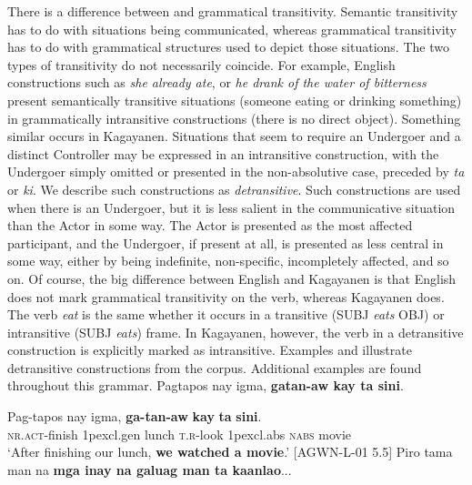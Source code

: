 There is a difference between  and grammatical transitivity. Semantic transitivity has to do with situations being communicated, whereas grammatical transitivity has to do with grammatical structures used to depict those situations. The two types of transitivity do not necessarily coincide. For example, English constructions such as \textit{she already ate}, or \textit{he drank of the water of bitterness} present semantically transitive situations (someone eating or drinking something) in grammatically intransitive constructions (there is no direct object). Something similar occurs in Kagayanen. Situations that seem to require an Undergoer and a distinct Controller may be expressed in an intransitive construction, with the Undergoer simply omitted or presented in the non-absolutive case, preceded by \textit{ta} or \textit{ki}. We describe such constructions as \textit{detransitive}. Such constructions are used when there is an Undergoer, but it is less salient in the communicative situation than the Actor in some way. The Actor is presented as the most affected participant, and the Undergoer, if present at all, is presented as less central in some way, either by being indefinite, non-specific, incompletely affected, and so on. Of course, the big difference between English and Kagayanen is that English does not mark grammatical transitivity on the verb, whereas Kagayanen does. The verb \textit{eat} is the same whether it occurs in a transitive (SUBJ \textit{eats} OBJ) or intransitive (SUBJ \textit{eats}) frame. In Kagayanen, however, the verb in a detransitive construction is explicitly marked as intransitive. Examples  and  illustrate detransitive constructions from the corpus. Additional examples are found throughout this grammar.
\ea
\label{bkm:Ref118364790}
Pagtapos  nay  igma,  \textbf{gatan-aw  kay  ta  sini}. \\\smallskip

\gll Pag-tapos  nay  igma,  \textbf{ga-tan-aw}  \textbf{kay}  \textbf{ta}  \textbf{sini}. \\
\textsc{nr.act}-finish 1p{excl.gen} lunch \textsc{t.r}-look 1p{excl.abs}  \textsc{nabs}  movie \\
\glt ‘After finishing our lunch, \textbf{we watched a movie}.’ [AGWN-L-01 5.5]
\z
\ea
\label{bkm:Ref125017724}
Piro  tama  man  na  \textbf{mga  inay  na  galuag  man  ta  kaanlao}... \\\smallskip

